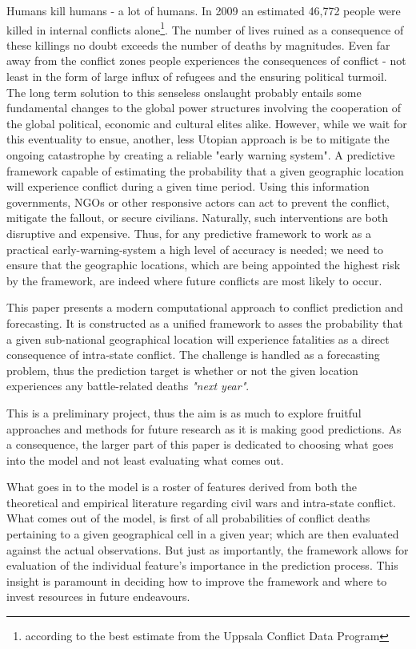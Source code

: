\documentclass[a4paper]{article}
\begin{document}
Humans kill humans - a lot of humans. In 2009 an estimated 46,772 people were killed in internal conflicts alone\footnote{according to the best estimate from the Uppsala Conflict Data Program}. The number of lives ruined as a consequence of these killings no doubt exceeds the number of deaths by magnitudes. Even far away from the conflict zones people experiences the consequences of conflict - not least in the form of large influx of refugees and the ensuring political turmoil. The long term solution to this senseless onslaught probably entails some fundamental changes to the global power structures involving the cooperation of the global political, economic and cultural elites alike. However, while we wait for this eventuality to ensue, another, less Utopian approach is be to mitigate the ongoing catastrophe by creating a reliable "early warning system". A predictive framework capable of estimating the probability that a given geographic location will experience conflict during a given time period. Using this information governments, NGOs or other responsive actors can act to prevent the conflict, mitigate the fallout, or secure civilians. Naturally, such interventions are both disruptive and expensive. Thus, for any predictive framework to work as a practical early-warning-system a high level of accuracy is needed; we need to ensure that the geographic locations, which are being appointed the highest risk by the framework, are indeed where future conflicts are most likely to occur.\par

This paper presents a modern computational approach to conflict prediction and forecasting. It is constructed as a unified framework to asses the probability that a given sub-national geographical location will experience fatalities as a direct consequence of intra-state conflict. The challenge is handled as a forecasting problem, thus the prediction target is whether or not the given location experiences any battle-related deaths \emph{"next year"}.\par 

This is a preliminary project, thus the aim is as much to explore fruitful approaches and methods for future research as it is making good predictions. As a consequence, the larger part of this paper is dedicated to choosing what goes into the model and not least evaluating what comes out.\par

What goes in to the model is a roster of features derived from both the theoretical and empirical literature regarding civil wars and intra-state conflict. What comes out of the model, is first of all probabilities of conflict deaths pertaining to a given geographical cell in a given year; which are then evaluated against the actual observations. But just as importantly, the framework allows for evaluation of the individual feature's importance in the prediction process. This insight is paramount in deciding how to improve the framework and where to invest resources in future endeavours.\par
\end{document}
